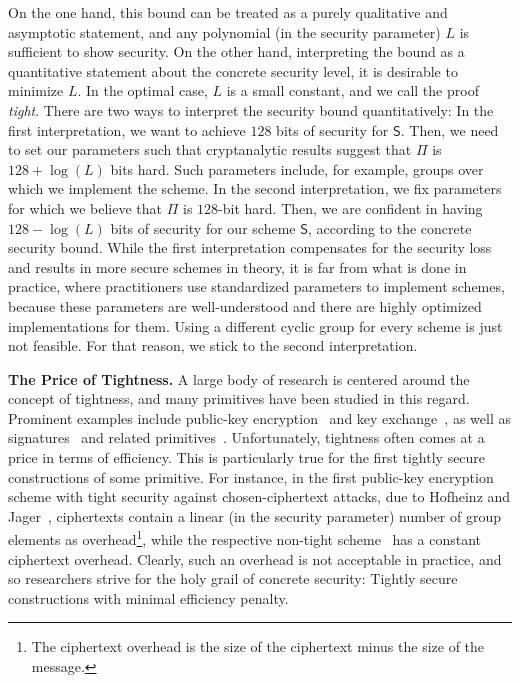 \documentclass[version=final]{iacrcc}
\theoremstyle{mytheorem}				\newtheorem{theorem}{Theorem}
\theoremstyle{myplain}
\theoremstyle{mydefinition}
\theoremstyle{myremark}
\begin{document}
On the one hand, this bound can be treated as a purely qualitative and asymptotic statement, and any polynomial (in the security parameter) $L$ is sufficient to show security.
On the other hand, interpreting the bound as a quantitative statement about the concrete security level, it is desirable to minimize $L$.
In the optimal case, $L$ is a small constant, and we call the proof \emph{tight}.
There are two ways to interpret the security bound quantitatively: 
In the first interpretation, we want to achieve $128$ bits of security for ${\mathsf{S}}$.
Then, we need to set our parameters such that cryptanalytic results suggest that $\Pi$ is $128+\log(L)$ bits hard.
Such parameters include, for example, groups over which we implement the scheme.
In the second interpretation, we fix parameters for which we believe that $\Pi$ is $128$-bit hard.
Then, we are confident in having $128-\log(L)$ bits of security for our scheme ${\mathsf{S}}$, according to the concrete security bound.
While the first interpretation compensates for the security loss and results in more secure schemes in theory, it is far from what is done in practice, where
practitioners use standardized parameters to implement schemes, because these parameters are well-understood and there are highly optimized implementations for them.
Using a different cyclic group for every scheme is just not feasible. 
For that reason, we stick to the second interpretation.

\smallskip\noindent\textbf{The Price of Tightness.}
A large body of research is centered around the concept of tightness, and many primitives have been studied in this regard.
Prominent examples include public-key encryption~\cite{EC:BelBolMic00,C:HofJag12,EC:BJLS16,EC:GHKW16,EC:Hofheinz17} and key exchange~\cite{TCC:BHJKL15,C:GjoJag18,AC:LLGW20,C:HJKLPRS21,ACNS:DavGun21}, as well as signatures~\cite{CCS:KatWan03,C:HofJag12,EC:AFLT12,PKC:BKKP15,EC:BJLS16,AC:BoyLi16,C:KilMasPan16,PKC:DGJL21,PKC:PanWag22} and related primitives~\cite{C:CheWee13,C:BlaKilPan14,EC:GHKP18,AC:LanPan20,EC:PanWag23}.
Unfortunately, tightness often comes at a price in terms of efficiency. This is particularly true for the first tightly secure constructions of some primitive.
For instance, in the first public-key encryption scheme with tight security against chosen-ciphertext attacks, due to Hofheinz and Jager~\cite{C:HofJag12}, 
ciphertexts contain a linear (in the security parameter) number of group elements as overhead\footnote{The ciphertext overhead is the size of the ciphertext minus the size of the message.}, while the respective non-tight scheme~\cite{C:KurDes04} has a constant ciphertext overhead.
Clearly, such an overhead is not acceptable in practice, and so researchers strive for the holy grail of concrete security: Tightly secure constructions with minimal efficiency penalty.
\end{document}
